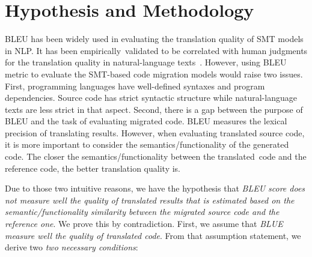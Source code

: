 \section{Hypothesis and Methodology}


BLEU has been widely used in evaluating the translation quality of SMT
models in NLP. It has been empirically~validated to be correlated with
human judgments for the translation quality in natural-language
texts~\cite{Papineni2002}.
%
%
However, using BLEU metric to evaluate
the SMT-based code migration models would raise two issues. First,
programming languages
have well-defined syntaxes and program dependencies. Source code has
strict syntactic structure while natural-language texts are less
strict in that aspect.
%
%
Second, there is a gap between the purpose of BLEU and the task of
evaluating migrated code. BLEU measures the lexical precision of
translating results. However, when evaluating translated source code,
it is more important to consider the semantics/functionality of
the generated code.
%
The closer the semantics/functionality between the translated~code and
the reference code, the better translation quality is.
%

Due to those two intuitive reasons, we have the hypothesis that {\em
  BLEU score does not measure well the quality of translated results
  that is estimated based on the semantic/functionality similarity
  between the migrated source code and the reference one}. We prove
this by contradiction. First, we assume that {\em BLUE measure well
  the quality of translated code}. From that assumption statement, we
derive two {\em two necessary conditions}:

